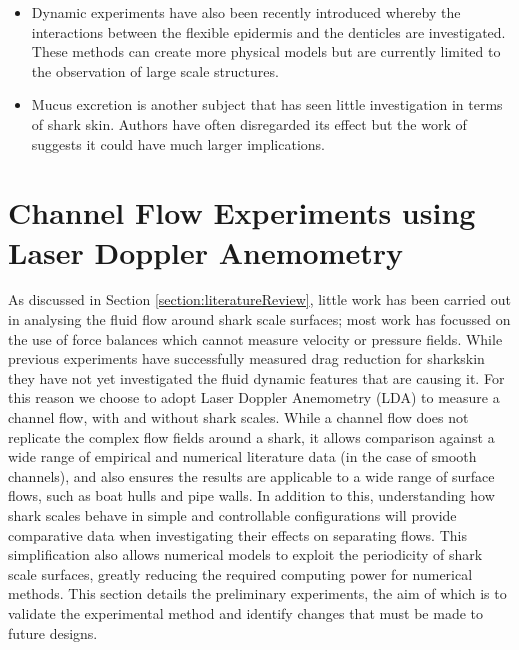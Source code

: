 \documentclass[12pt,oneside,a4paper]{article}
\begin{document}
\begin{itemize}
%
\item Dynamic experiments have also been recently introduced whereby the interactions between the flexible epidermis and the denticles are investigated. These methods can create more physical models but are currently limited to the observation of large scale structures. 
%
\item Mucus excretion is another subject that has seen little investigation in terms of shark skin. Authors have often disregarded its effect but the work of \cite{zhang2011b} suggests it could have much larger implications. 
%
\end{itemize}

\newpage

\section{Channel Flow Experiments using Laser Doppler Anemometry}
As discussed in Section \ref{section:literatureReview}, little work has been carried out in analysing the fluid flow around shark scale surfaces; most work has focussed on the use of force balances which cannot measure velocity or pressure fields. While previous experiments have successfully measured drag reduction for sharkskin they have not yet investigated the fluid dynamic features that are causing it. For this reason we choose to adopt Laser Doppler Anemometry (LDA) to measure a channel flow, with and without shark scales. While a channel flow does not replicate the complex flow fields around a shark, it allows comparison against a wide range of empirical and numerical literature data (in the case of smooth channels), and also ensures the results are applicable to a wide range of surface flows, such as boat hulls and pipe walls. In addition to this, understanding how shark scales behave in simple and controllable configurations will provide comparative data when investigating their effects on separating flows. This simplification also allows numerical models to exploit the periodicity of shark scale surfaces, greatly reducing the required computing power for numerical methods. This section details the preliminary experiments, the aim of which is to validate the experimental method and identify changes that must be made to future designs.
\end{document}
